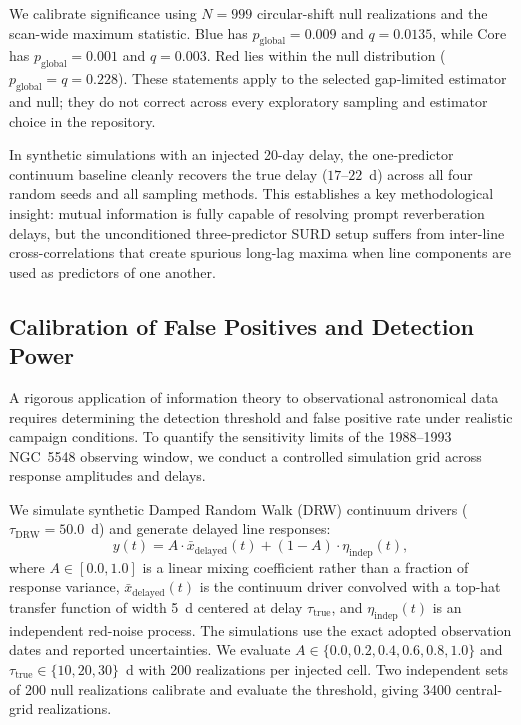 \documentclass[fleqn,usenatbib]{mnras}
\begin{document}
We calibrate significance using $N=999$ circular-shift null realizations and the scan-wide maximum statistic. Blue has $p_{\mathrm{global}}=0.009$ and $q=0.0135$, while Core has $p_{\mathrm{global}}=0.001$ and $q=0.003$. Red lies within the null distribution ($p_{\mathrm{global}}=q=0.228$). These statements apply to the selected gap-limited estimator and null; they do not correct across every exploratory sampling and estimator choice in the repository.

In synthetic simulations with an injected 20-day delay, the one-predictor continuum baseline cleanly recovers the true delay ($17$--$22$~d) across all four random seeds and all sampling methods. This establishes a key methodological insight: mutual information is fully capable of resolving prompt reverberation delays, but the unconditioned three-predictor SURD setup suffers from inter-line cross-correlations that create spurious long-lag maxima when line components are used as predictors of one another.

\subsection{Calibration of False Positives and Detection Power}
\label{sec:detection_power}

A rigorous application of information theory to observational astronomical data requires determining the detection threshold and false positive rate under realistic campaign conditions. To quantify the sensitivity limits of the 1988--1993 NGC~5548 observing window, we conduct a controlled simulation grid across response amplitudes and delays.

We simulate synthetic Damped Random Walk (DRW) continuum drivers ($\tau_{\mathrm{DRW}} = 50.0$~d) and generate delayed line responses:
\begin{equation}
y(t) = A \cdot \bar{x}_{\mathrm{delayed}}(t) + (1 - A) \cdot \eta_{\mathrm{indep}}(t),
\end{equation}
where $A \in [0.0, 1.0]$ is a linear mixing coefficient rather than a fraction of response variance, $\bar{x}_{\mathrm{delayed}}(t)$ is the continuum driver convolved with a top-hat transfer function of width 5~d centered at delay $\tau_{\mathrm{true}}$, and $\eta_{\mathrm{indep}}(t)$ is an independent red-noise process. The simulations use the exact adopted observation dates and reported uncertainties. We evaluate $A \in \{0.0, 0.2, 0.4, 0.6, 0.8, 1.0\}$ and $\tau_{\mathrm{true}} \in \{10, 20, 30\}$~d with 200 realizations per injected cell. Two independent sets of 200 null realizations calibrate and evaluate the threshold, giving 3400 central-grid realizations.
\end{document}
